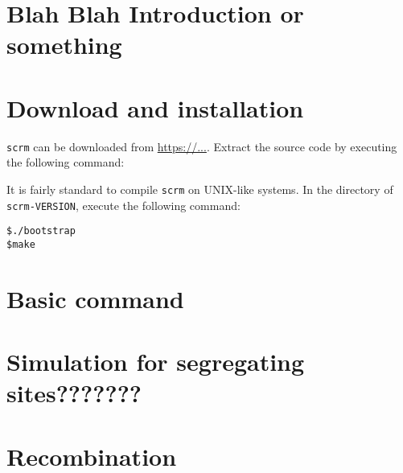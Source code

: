
\section{Blah Blah Introduction or something}

\section{Download and installation}
{\tt scrm} can be downloaded from \url{https://...}. Extract the source code by executing the following command:

It is fairly standard to compile {\tt scrm} on UNIX-like systems. In the directory of {\tt scrm-VERSION}, execute the following command:
\begin{verbatim}
$./bootstrap
$make
\end{verbatim}

\section{Basic command}




\section{Simulation for segregating sites???????}



\section{Recombination}






